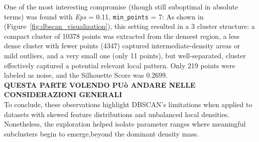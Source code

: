 One of the most interesting compromise (though still suboptimal in absolute terms) was found with \textit{Eps} = 0.11, \texttt{min\_points} = 7: 
As shown in (Figure~\ref{fig:dbscan_visualization}), this setting resulted in a 3 cluster structure: a compact cluster of 10378 points was extracted from the densest region, a less dense cluster with fewer points (4347) captured intermediate-density areas or mild outliers, 
and a very small one (only 11 points), but well-separated, cluster effectively captured a potential relevant local pattern. Only 219 points were labeled as noise, and the Silhouette Score was 0.2699.\\

\textbf{QUESTA PARTE VOLENDO PUò ANDARE NELLE CONSIDERAZIONI GENERALI}\\
To conclude, these observations highlight DBSCAN's limitations when applied to datasets with skewed feature distributions and unbalanced local densities.
Nonetheless, the exploration helped isolate parameter ranges where meaningful subclusters begin to emerge,beyond the dominant density mass.











